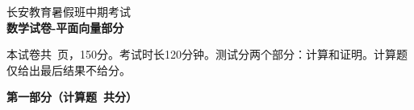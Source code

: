 \documentclass[12pt, a4paper]{article}
\def\mycenter#1{\begin{center} \bf \sffamily \large #1 \end{center}}
\begin{document}
\begin{center}
    \huge 长安教育暑假班中期考试 \\
    \Large \bf \sffamily 数学试卷-平面向量部分
\end{center}

本试卷共\pageref{LastPage}\ 页，150分。考试时长120分钟。测试分两个部分：计算和证明。计算题仅给出最后结果不给分。

\mycenter{第一部分（计算题\ 共\textmd{}分）}

\end{document}
